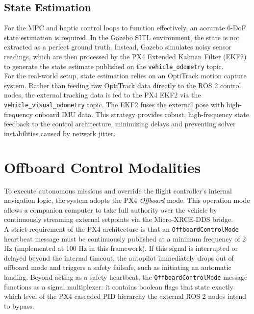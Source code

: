 \subsection{State Estimation}
For the MPC and haptic control loops to function effectively, an accurate 6-DoF state estimation is required. In the Gazebo SITL environment, the state is not extracted as a perfect ground truth. Instead, Gazebo simulates noisy sensor readings, which are then processed by the PX4 Extended Kalman Filter (EKF2) to generate the state estimate published on the \texttt{vehicle\_odometry} topic.
\\For the real-world setup, state estimation relies on an OptiTrack motion capture system. Rather than feeding raw OptiTrack data directly to the ROS 2 control nodes, the external tracking data is fed to the PX4 EKF2 via the \texttt{vehicle\_visual\_odometry} topic. The EKF2 fuses the external pose with high-frequency onboard IMU data. This strategy provides robust, high-frequency state feedback to the control architecture, minimizing delays and preventing solver instabilities caused by network jitter.
\section{Offboard Control Modalities}

To execute autonomous missions and override the flight controller's internal navigation logic, the system adopts the PX4 \textit{Offboard} mode. This operation mode allows a companion computer to take full authority over the vehicle by continuously streaming external setpoints via the Micro-XRCE-DDS bridge. 
\\A strict requirement of the PX4 architecture is that an \texttt{OffboardControlMode} heartbeat message must be continuously published at a minimum frequency of 2 Hz (implemented at 100 Hz in this framework). If this signal is interrupted or delayed beyond the internal timeout, the autopilot immediately drops out of offboard mode and triggers a safety failsafe, such as initiating an automatic landing. Beyond acting as a safety heartbeat, the \texttt{OffboardControlMode} message functions as a signal multiplexer: it contains boolean flags that state exactly which level of the PX4 cascaded PID hierarchy the external ROS 2 nodes intend to bypass.

